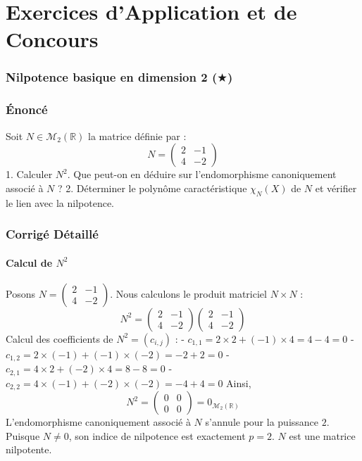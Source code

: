 \documentclass[11pt,a4paper]{article}
\begin{document}
\part{Exercices d'Application et de Concours}

\section{Nilpotence basique en dimension 2 ($\bigstar$)}

\section{Énoncé}
Soit $N \in \mathcal{M}_2(\mathbb{R})$ la matrice définie par :
$$N = \begin{pmatrix} 2 & -1 \\ 4 & -2 \end{pmatrix}$$
1. Calculer $N^2$. Que peut-on en déduire sur l'endomorphisme canoniquement associé à $N$ ?
2. Déterminer le polynôme caractéristique $\chi_N(X)$ de $N$ et vérifier le lien avec la nilpotence.

\section{Corrigé Détaillé}

\subsection{Calcul de $N^2$}
Posons $N = \begin{pmatrix} 2 & -1 \\ 4 & -2 \end{pmatrix}$.
Nous calculons le produit matriciel $N \times N$ :
$$N^2 = \begin{pmatrix} 2 & -1 \\ 4 & -2 \end{pmatrix} \begin{pmatrix} 2 & -1 \\ 4 & -2 \end{pmatrix}$$
Calcul des coefficients de $N^2 = (c_{i,j})$ :
- $c_{1,1} = 2 \times 2 + (-1) \times 4 = 4 - 4 = 0$
- $c_{1,2} = 2 \times (-1) + (-1) \times (-2) = -2 + 2 = 0$
- $c_{2,1} = 4 \times 2 + (-2) \times 4 = 8 - 8 = 0$
- $c_{2,2} = 4 \times (-1) + (-2) \times (-2) = -4 + 4 = 0$
Ainsi,
$$N^2 = \begin{pmatrix} 0 & 0 \\ 0 & 0 \end{pmatrix} = 0_{\mathcal{M}_2(\mathbb{R})}$$
L'endomorphisme canoniquement associé à $N$ s'annule pour la puissance $2$. Puisque $N \neq 0$, son indice de nilpotence est exactement $p = 2$. $N$ est une matrice nilpotente.
\end{document}
